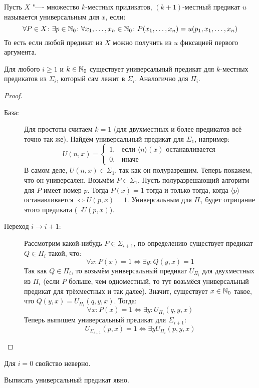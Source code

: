 \item
	\begin{Def}
		Пусть $X$ "---- множество $k$-местных придикатов, $(k+1)$-местный предикат $u$
		называется универсальным для $x$, если:
		\[
		\forall P \in X \colon \exists p \in \mathbb{N}_0 \colon \forall x_1, \dots, x_n \in \mathbb{N}_0 \colon
		P(x_1, \dots, x_n) = u(p_1, x_1, \dots, x_n)
		\]
		То есть если любой предикат из $X$ можно получить из $u$ фиксацией первого аргумента.
	\end{Def}
	Для любого $i \ge 1$ и $k \in \mathbb{N}_0$ существует универсальный предикат для $k$-местных предикатов
	из $\Sigma_i$, который сам лежит в $\Sigma_i$.
	Аналогично для $\Pi_i$.
	\begin{proof}
		\begin{description}
		\item[База:]
			Для простоты считаем $k=1$ (для двухместных и более предикатов всё точно так же).
			Найдём универсальный предикат для $\Sigma_1$, например:
			\[
			U(n, x) =
			\left\{
			\begin{matrix}
			1, &\text{если $\langle n\rangle(x)$ останавливается} \\
			0, &\text{иначе}
			\end{matrix}
			\right.
			\]
			В самом деле, $U(n, x) \in \Sigma_1$, так как он полуразрешим.
			Теперь покажем, что он универсален.
			Возьмём $P\in \Sigma_1$.
			Пусть полуразрешающий алгоритм для $P$ имеет номер $p$.
			Тогда $P(x)=1$ тогда и только тогда, когда $\langle p \rangle$ останавливается $\iff U(p, x)=1$.
			Универсальным для $\Pi_1$ будет отрицание этого предиката ($\lnot U(p, x)$).
		\item[Переход $i \to i+1$:]
			Рассмотрим какой-нибудь $P \in \Sigma_{i+1}$, по определению существует предикат $Q \in \Pi_i$ такой, что:
			\[ \forall x \colon P(x) = 1 \iff \exists y \colon Q(y, x) = 1 \]
			Так как $Q \in \Pi_i$, то возьмём универсальный предикат $U_{\Pi_i}$ для двухместных из $\Pi_i$
			(если $P$ больше, чем одноместный, то тут возьмёся универсальный предикат для трёхместных и так далее).
			Значит, существует $x \in \mathbb{N}_0$ такое, что $Q(y, x) = U_{\Pi_i}(q, y, x)$.
			Тогда:
			\[ \forall x \colon P(x) = 1 \iff \exists y \colon U_{\Pi_i}(q, y, x) \]
			Теперь выпишем универсальный предикат для $\Sigma_{i+1}$:
			\[ U_{\Sigma_{i+1}}(p, x) = 1 \iff \exists y U_{\Pi_i}(p, y, x) \]
			\TODO
		\end{description}
	\end{proof}
	\begin{Exercise}
		Для $i=0$ свойство неверно.
	\end{Exercise}	
	\begin{Exercise}
		Выписать универсальный предикат явно.
	\end{Exercise}	

